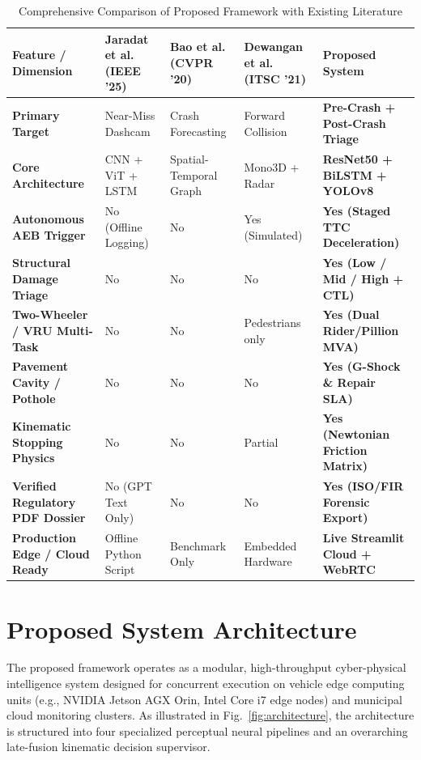 \documentclass[journal,compsoc]{IEEEtran}
\begin{document}
\begin{table}[t]
\centering
\caption{Comprehensive Comparison of Proposed Framework with Existing Literature}
\label{tab:sota_comparison}
\begin{tabular}{lllll}
\toprule
\textbf{Feature / Dimension} & \textbf{Jaradat et al.~\cite{jaradat2025leveraging} (IEEE '25)} & \textbf{Bao et al.~\cite{bao2020drive} (CVPR '20)} & \textbf{Dewangan et al.~\cite{dewan2021multimodal} (ITSC '21)} & \textbf{Proposed System} \\
\midrule
\textbf{Primary Target} & Near-Miss Dashcam & Crash Forecasting & Forward Collision & \textbf{Pre-Crash + Post-Crash Triage} \\
\textbf{Core Architecture} & CNN + ViT + LSTM & Spatial-Temporal Graph & Mono3D + Radar & \textbf{ResNet50 + BiLSTM + YOLOv8} \\
\textbf{Autonomous AEB Trigger} & No (Offline Logging) & No & Yes (Simulated) & \textbf{Yes (Staged TTC Deceleration)} \\
\textbf{Structural Damage Triage} & No & No & No & \textbf{Yes (Low / Mid / High + CTL)} \\
\textbf{Two-Wheeler / VRU Multi-Task} & No & No & Pedestrians only & \textbf{Yes (Dual Rider/Pillion MVA)} \\
\textbf{Pavement Cavity / Pothole} & No & No & No & \textbf{Yes (G-Shock \& Repair SLA)} \\
\textbf{Kinematic Stopping Physics} & No & No & Partial & \textbf{Yes (Newtonian Friction Matrix)} \\
\textbf{Verified Regulatory PDF Dossier} & No (GPT Text Only) & No & No & \textbf{Yes (ISO/FIR Forensic Export)} \\
\textbf{Production Edge / Cloud Ready} & Offline Python Script & Benchmark Only & Embedded Hardware & \textbf{Live Streamlit Cloud + WebRTC} \\
\bottomrule
\end{tabular}
\end{table}

\section{Proposed System Architecture}
The proposed framework operates as a modular, high-throughput cyber-physical intelligence system designed for concurrent execution on vehicle edge computing units (e.g., NVIDIA Jetson AGX Orin, Intel Core i7 edge nodes) and municipal cloud monitoring clusters. As illustrated in Fig.~\ref{fig:architecture}, the architecture is structured into four specialized perceptual neural pipelines and an overarching late-fusion kinematic decision supervisor.
\end{document}

